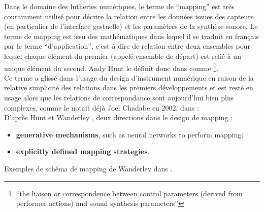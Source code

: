 \noindent Dans le domaine des lutheries numériques, le terme de ``mapping'' est très couramment utilisé pour décrire la relation entre les données issues des capteurs (en particulier de l'interface gestuelle) et les paramètres de la synthèse sonore. 
Le terme de mapping est issu des mathématiques dans lequel il se traduit en français par le terme ``d'application'', c'est à dire de relation entre deux ensembles pour lequel chaque élément du premier (appelé ensemble de départ) est relié à un unique élément du second. Andy Hunt le définit donc dans \cite{hunt_towards_2000} comme \footnote{``the liaison or correspondence between control parameters (derived from performer actions) and sound synthesis parameters''}.\\
\indent Ce terme a glissé dans l'usage du design d'instrument numérique en raison de la relative simplicité des relations dans les premiers développements et est resté en usage alors que les relations de correspondance sont aujourd'hui bien plus complexes, comme le notait déjà Joel Chadabe en 2002, dans \cite{chadabe_limitations_2002}: \\
\indent D'après Hunt et Wanderley \cite{hunt_mapping_2002}, deux directions dans le design de mapping :
\vspace{-1em}
\begin{itemize}[noitemsep]
	\item \textbf{generative mechanisms}, such as neural networks to perform mapping;
	\item \textbf{explicitly defined mapping strategies}.
\end{itemize}

Exemples de schéma de mapping de Wanderley dans \cite{wanderley_escher-modeling_1998}.

